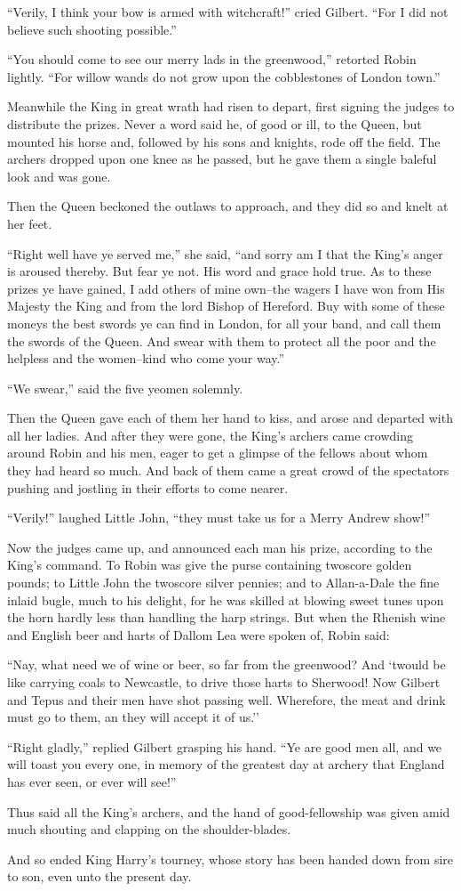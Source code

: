 ``Verily, I think your bow is armed with witchcraft!'' cried Gilbert.
``For I did not believe such shooting possible.''

``You should come to see our merry lads in the greenwood,'' retorted
Robin lightly. ``For willow wands do not grow upon the cobblestones of
London town.''

Meanwhile the King in great wrath had risen to depart, first signing the
judges to distribute the prizes. Never a word said he, of good or ill,
to the Queen, but mounted his horse and, followed by his sons and
knights, rode off the field. The archers dropped upon one knee as he
passed, but he gave them a single baleful look and was gone.

Then the Queen beckoned the outlaws to approach, and they did so and
knelt at her feet.

``Right well have ye served me,'' she said, ``and sorry am I that the
King's anger is aroused thereby. But fear ye not. His word and grace
hold true. As to these prizes ye have gained, I add others of mine
own--the wagers I have won from His Majesty the King and from the lord
Bishop of Hereford. Buy with some of these moneys the best swords ye can
find in London, for all your band, and call them the swords of the
Queen. And swear with them to protect all the poor and the helpless and
the women--kind who come your way.''

``We swear,'' said the five yeomen solemnly.

Then the Queen gave each of them her hand to kiss, and arose and
departed with all her ladies. And after they were gone, the King's
archers came crowding around Robin and his men, eager to get a glimpse
of the fellows about whom they had heard so much. And back of them came
a great crowd of the spectators pushing and jostling in their efforts to
come nearer.

``Verily!'' laughed Little John, ``they must take us for a Merry Andrew
show!''

Now the judges came up, and announced each man his prize, according to
the King's command. To Robin was give the purse containing twoscore
golden pounds; to Little John the twoscore silver pennies; and to
Allan-a-Dale the fine inlaid bugle, much to his delight, for he was
skilled at blowing sweet tunes upon the horn hardly less than handling
the harp strings. But when the Rhenish wine and English beer and harts
of Dallom Lea were spoken of, Robin said:

``Nay, what need we of wine or beer, so far from the greenwood? And
`twould be like carrying coals to Newcastle, to drive those harts to
Sherwood! Now Gilbert and Tepus and their men have shot passing well.
Wherefore, the meat and drink must go to them, an they will accept it of
us.''

``Right gladly,'' replied Gilbert grasping his hand. ``Ye are good men
all, and we will toast you every one, in memory of the greatest day at
archery that England has ever seen, or ever will see!''

Thus said all the King's archers, and the hand of good-fellowship was
given amid much shouting and clapping on the shoulder-blades.

And so ended King Harry's tourney, whose story has been handed down from
sire to son, even unto the present day.

